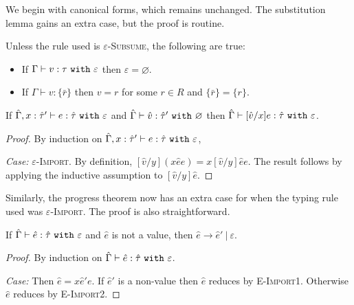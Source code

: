 We begin with canonical forms, which remains unchanged. The substitution lemma gains an extra case, but the proof is routine.


\begin{lemma}
Unless the rule used is \textsc{$\varepsilon$-Subsume}, the following are true:
\begin{itemize}
	\setlength\itemsep{-0.7em}
	\item If $ \Gamma \vdash  v:  \tau~\mathtt{with}~ \varepsilon$ then $\varepsilon = \varnothing$.
	\item If $ \Gamma \vdash  v: \{ \bar r \}$ then $ v = r$ for some $r \in R$ and $\{ \bar r \} = \{ r \}$.
\end{itemize}
\end{lemma}

\begin{lemma}[Substitution]
If $\hat \Gamma, x: \hat \tau' \vdash e: \hat \tau~\mathtt{with}~ \varepsilon$ and $\hat \Gamma \vdash \hat v: \hat \tau'~\mathtt{with}~ \varnothing$ then $\hat \Gamma \vdash [\hat v/x]e: \hat \tau~\mathtt{with}~ \varepsilon$.
\end{lemma}

\begin{proof} By induction on $\hat \Gamma, x: \hat \tau' \vdash e: \hat \tau~\mathtt{with}~ \varepsilon$,

\textit{Case:} \textsc{$\varepsilon$-Import}. By definition, $[\hat v/y]({x}{\hat e}{e}) = {x}{[\hat v/y] \hat e}{e}$. The result follows by applying the inductive assumption to $[\hat v/y] \hat e$.
\end{proof}

Similarly, the progress theorem now has an extra case for when the typing rule used was \textsc{$\varepsilon$-Import}. The proof is also straightforward.

\begin{theorem}[Progress]
If $\hat \Gamma \vdash \hat e: \hat \tau~\mathtt{with}~ \varepsilon$ and $\hat e$ is not a value, then $\hat e \longrightarrow \hat e'~|~\varepsilon$.
\end{theorem}

\begin{proof} By induction on $\hat \Gamma \vdash \hat e: \hat \tau~\mathtt{with}~ \varepsilon$.

\textit{Case:} Then $\hat e = {x}{\hat e'}{e}$. If $\hat e'$ is a non-value then $\hat e$ reduces by \textsc{E-Import1}. Otherwise $\hat e$ reduces by \textsc{E-Import2}.
\end{proof}

